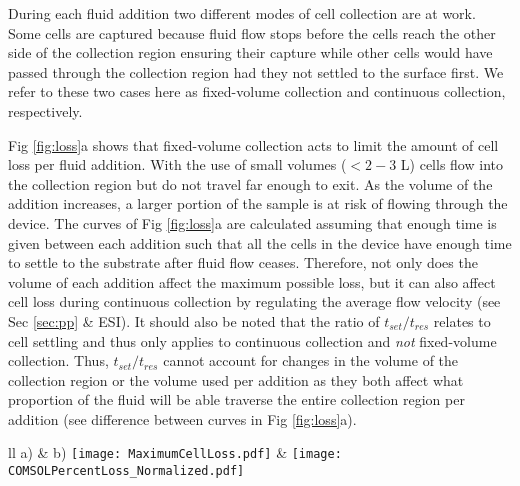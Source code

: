 During each fluid addition two different modes of cell collection are at work. Some cells are captured because fluid flow stops before the cells reach the other side of the collection region ensuring their capture while other cells would have passed through the collection region had they not settled to the surface first. We refer to these two cases here as fixed-volume collection and continuous collection, respectively. 

Fig \ref{fig:loss}a shows that fixed-volume collection acts to limit the amount of cell loss per fluid addition. With the use of small volumes ($< 2-3$ \textmu L) cells flow into the collection region but do not travel far enough to exit. As the volume of the addition increases, a larger portion of the sample is at risk of flowing through the device. The curves of Fig \ref{fig:loss}a are calculated assuming that enough time is given between each addition such that all the cells in the device have enough time to settle to the substrate after fluid flow ceases. Therefore, not only does the volume of each addition affect the maximum possible loss, but it can also affect cell loss during continuous collection by regulating the average flow velocity (see Sec \ref{sec:pp} \& ESI). It should also be noted that the ratio of $t_{set}/t_{res}$ relates to cell settling and thus only applies to continuous collection and \emph{not} fixed-volume collection. Thus, $t_{set}/t_{res}$ cannot account for changes in the volume of the collection region or the volume used per addition as they both affect what proportion of the fluid will be able traverse the entire collection region per addition (see difference between curves in Fig \ref{fig:loss}a).

\begin{figure*}[!t]
\centering
\begin{tabular}{ll}
a) & b) \cr
\texttt{[image: MaximumCellLoss.pdf]} &
\texttt{[image: COMSOLPercentLoss\_Normalized.pdf]}\cr
\end{tabular}
\caption{\textbf{Cell loss calculations using computational models of fluid flow for Design I and II}. Flow rate through the devices is varied to produce different residence times in the collection region, causing the value of $t_{set}/t_{res}$ to change. a) Maximum cell loss that can be achieved with a given volume addition due to fixed-volume effects (see Sec \ref{sec:collection}). b) Simulation data of cell loss under various conditions normalized to the maximum cell loss dictated by fixed-volume effects.}
\label{fig:loss}
\end{figure*}


